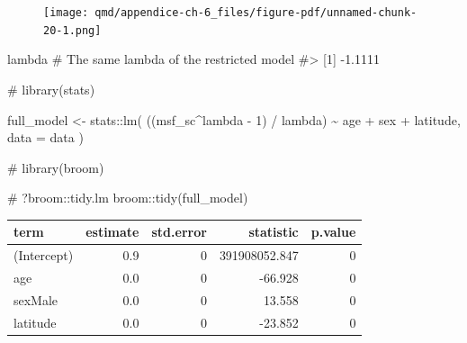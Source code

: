 \documentclass[
  12pt,
  a4paper,
  oneside]{tesesusp}
\newenvironment{Shaded}{\begin{snugshade}}{\end{snugshade}}
\newcommand{\AttributeTok}[1]{\textcolor[rgb]{0.40,0.45,0.13}{#1}}
\newcommand{\CommentTok}[1]{\textcolor[rgb]{0.37,0.37,0.37}{#1}}
\newcommand{\DecValTok}[1]{\textcolor[rgb]{0.68,0.00,0.00}{#1}}
\newcommand{\FunctionTok}[1]{\textcolor[rgb]{0.28,0.35,0.67}{#1}}
\newcommand{\NormalTok}[1]{\textcolor[rgb]{0.00,0.23,0.31}{#1}}
\newcommand{\OtherTok}[1]{\textcolor[rgb]{0.00,0.23,0.31}{#1}}
\newcommand{\SpecialCharTok}[1]{\textcolor[rgb]{0.37,0.37,0.37}{#1}}
\begin{document}
\begin{figure}[H]

{\centering \texttt{[image: qmd/appendice-ch-6\_files/figure-pdf/unnamed-chunk-20-1.png]}

}

\end{figure}

\begin{Shaded}
\end{Shaded}

\begin{Shaded}
\begin{Highlighting}[numbers=left,,]
\NormalTok{lambda }\CommentTok{\# The same lambda of the restricted model}
\CommentTok{\#\textgreater{} [1] {-}1.1111}
\end{Highlighting}
\end{Shaded}

\begin{Shaded}
\begin{Highlighting}[numbers=left,,]
\CommentTok{\# library(stats)}

\NormalTok{full\_model }\OtherTok{\textless{}{-}}\NormalTok{ stats}\SpecialCharTok{::}\FunctionTok{lm}\NormalTok{(}
\NormalTok{  ((msf\_sc}\SpecialCharTok{\^{}}\NormalTok{lambda }\SpecialCharTok{{-}} \DecValTok{1}\NormalTok{) }\SpecialCharTok{/}\NormalTok{ lambda) }\SpecialCharTok{\textasciitilde{}}\NormalTok{ age }\SpecialCharTok{+}\NormalTok{ sex }\SpecialCharTok{+}\NormalTok{ latitude, }
  \AttributeTok{data =}\NormalTok{ data}
\NormalTok{  )}
\end{Highlighting}
\end{Shaded}

\begin{Shaded}
\begin{Highlighting}[numbers=left,,]
\CommentTok{\# library(broom)}

\CommentTok{\# ?broom::tidy.lm}
\NormalTok{broom}\SpecialCharTok{::}\FunctionTok{tidy}\NormalTok{(full\_model)}
\end{Highlighting}
\end{Shaded}

\begin{table}
\centering
\begin{tabular}{l|r|r|r|r}
\hline
term & estimate & std.error & statistic & p.value\\
\hline
(Intercept) & 0.9 & 0 & 391908052.847 & 0\\
\hline
age & 0.0 & 0 & -66.928 & 0\\
\hline
sexMale & 0.0 & 0 & 13.558 & 0\\
\hline
latitude & 0.0 & 0 & -23.852 & 0\\
\hline
\end{tabular}
\end{table}
\end{document}
